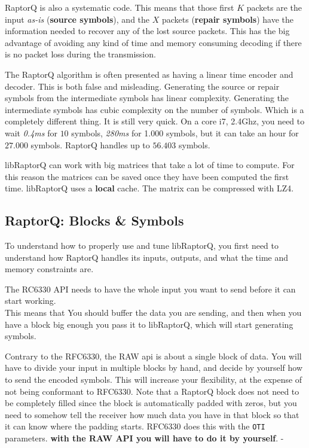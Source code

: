 \documentclass[11pt,a4paper]{refart}
\begin{document}
 RaptorQ is also a systematic code. This means that those first $K$ packets are the input \textit{as-is} (\textbf{source symbols}),
and the $X$ packets (\textbf{repair symbols}) have the information needed to recover any of the lost source packets. This has the big advantage of
avoiding any kind of time and memory consuming decoding if there is no packet loss during the transmission.

 The RaptorQ algorithm is often presented as having a linear time encoder and decoder. This is both false and misleading.
Generating the source or repair symbols from the intermediate symbols has linear complexity. Generating the intermediate symbols has cubic complexity on the
number of symbols. Which is a completely different thing.
It is still very quick. On a core i7, 2.4Ghz, you need to wait \textit{0.4ms} for $10$ symbols, \textit{280ms} for 1.000 symbols, but it can take an hour for $27.000$ symbols.
RaptorQ handles up to $56.403$ symbols.

 libRaptorQ can work with big matrices that take a lot of time to compute. For this reason the matrices can be saved once they have
been computed the first time. libRaptorQ uses a \textbf{local} cache. The matrix can be compressed with LZ4.

\subsection{RaptorQ: Blocks \& Symbols}

To understand how to properly use and tune libRaptorQ, you first need to understand how RaptorQ handles its inputs, outputs, and what the time and memory
constraints are.

The RC6330 API needs to have the whole input you want to send before it can start working.\\
This means that You should buffer the data you are sending, and then when you have a block big enough you pass it to libRaptorQ, which will start generating symbols.

Contrary to the RFC6330, the RAW api is about a single block of data. You will have to divide your input in multiple blocks by hand, and decide by yourself how to send the encoded symbols. This will increase your flexibility, at the expense of not being conformant to RFC6330.
Note that a RaptorQ block does not need to be completely filled since the block is automatically padded with zeros, but you need to somehow tell the receiver how much data you have in that block so that it can know where the padding starts. RFC6330 does this with the \texttt{OTI} parameters. \textbf{with the RAW API you will have to do it by yourself}.
-
\end{document}
